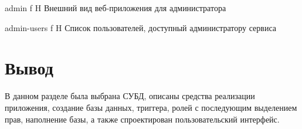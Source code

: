 {admin}
{f}
{H}
{\textwidth}
{Внешний вид веб-приложения для администратора}

{admin-users}
{f}
{H}
{\textwidth}
{Список пользователей, доступный администратору сервиса}

\section*{Вывод}

В данном разделе была выбрана СУБД, описаны средства реализации приложения, создание базы данных, триггера, ролей с последующим выделением прав, наполнение базы, а также спроектирован пользовательский интерфейс.
